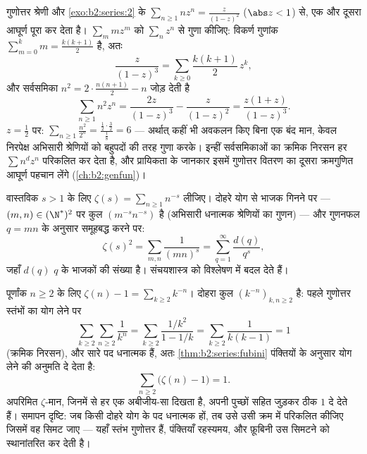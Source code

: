 \begin{example}\label{ex:b2:series:squaresum}
गुणोत्तर श्रेणी और \cref{exo:b2:series:2} के $\sum_{n
\geq 1} nz^n = \frac{z}{(1-z)^2}$ ($\abs z < 1$) से, एक और  दूसरा आघूर्ण
पूरा कर देता है। $\sum_m
mz^m$ को $\sum_n z^n$ से गुणा कीजिए: विकर्ण गुणांक $\sum_{m=0}^k
m = \frac{k(k+1)}2$ है, अतः
\[
\frac{z}{(1-z)^3} = \sum_{k\geq0}\frac{k(k+1)}{2}\,z^k ,
\]
और सर्वसमिका $n^2 = 2\cdot\frac{n(n+1)}2 - n$ जोड़ देती है
\[
\sum_{n\geq1} n^2z^n = \frac{2z}{(1-z)^3} - \frac{z}{(1-z)^2}
= \frac{z(1+z)}{(1-z)^3} .
\]
$z = \frac12$ पर: $\sum_{n\geq1}\frac{n^2}{2^n} =
\frac{\frac12\cdot\frac32}{\frac18} = 6$ --- अर्थात् कहीं भी अवकलन किए बिना एक बंद मान, केवल
निरपेक्ष अभिसारी श्रेणियों को बहुपदों की तरह गुणा करके। इन्हीं
सर्वसमिकाओं का क्रमिक निरसन हर $\sum n^dz^n$ परिकलित कर देता है, और प्रायिकता के
जानकार इसमें गुणोत्तर वितरण का दूसरा क्रमगुणित आघूर्ण पहचान लेंगे (\cref{ch:b2:genfun})।
\end{example}

\begin{example}[एक दोहरे योग का मूल्यांकन]\label{ex:b2:series:doublesum}
वास्तविक $s > 1$ के लिए $\zeta(s) = \sum_{n\geq1} n^{-s}$ लीजिए। दोहरे योग से भाजक गिनने पर --- $(m,n) \in (\N^*)^2$ पर
कुल $(m^{-s}n^{-s})$  है (अभिसारी धनात्मक श्रेणियों का गुणन) --- और गुणनफल $q = mn$
के अनुसार समूहबद्ध करने पर:
\[
\zeta(s)^2 = \sum_{m,n} \frac{1}{(mn)^s}
= \sum_{q=1}^{\infty} \frac{d(q)}{q^s},
\]
जहाँ $d(q)$ $q$ के भाजकों की संख्या है।  संचयशास्त्र को विश्लेषण
में बदल देते हैं।
\end{example}

\begin{example}[एक फ़ूबिनी मूल्यांकन: $\sum_n (\zeta(n) - 1) = 1$]\label{ex:b2:series:zetasum}
पूर्णांक $n \geq 2$ के लिए $\zeta(n) - 1 = \sum_{k \geq 2} k^{-n}$। दोहरा कुल $(k^{-n})_{k, n \geq 2}$  है: पहले गुणोत्तर स्तंभों
का योग लेने पर
\[
\sum_{k\geq2}\sum_{n\geq2} \frac{1}{k^n}
= \sum_{k\geq2} \frac{1/k^2}{1 - 1/k}
= \sum_{k\geq2} \frac{1}{k(k-1)} = 1
\]
(क्रमिक निरसन), और सारे पद धनात्मक हैं, अतः \cref{thm:b2:series:fubini} पंक्तियों के अनुसार योग
लेने की अनुमति दे देता है:
\[
\sum_{n\geq2}\bigl(\zeta(n) - 1\bigr) = 1 .
\]
अपरिमित $\zeta$-मान, जिनमें से हर एक अबीजीय-सा दिखता है, अपनी पुच्छों सहित
जुड़कर ठीक $1$ दे देते हैं। समापन दृष्टि: जब किसी दोहरे योग के पद
धनात्मक हों, तब उसे उसी क्रम में परिकलित कीजिए जिसमें वह सिमट जाए ---
यहाँ स्तंभ गुणोत्तर हैं, पंक्तियाँ रहस्यमय, और फ़ूबिनी उस सिमटने को
स्थानांतरित कर देती है।
\end{example}

